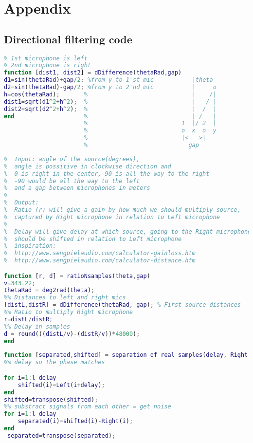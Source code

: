 \chapter{Appendix}
\label{ch:appAlabel}
\section{Directional filtering code}
\begin{lstlisting}[language=Matlab, label=lst:delayDifference]
% Gives distance for the signal to travel to each microphones 
% 1st microphone is left 
% 2nd microphone is right
function [dist1, dist2] = dDifference(thetaRad,gap)
d1=sin(thetaRad)+gap/2; %from y to 1'st mic           |theta
d2=sin(thetaRad)-gap/2; %from y to 2'nd mic           |     o
h=cos(thetaRad);       %                              |    /|
dist1=sqrt(d1^2+h^2);  %                              |   / |
dist2=sqrt(d2^2+h^2);  %                              |  /  |
end                    %                              | /   |
                       %                           1  |/ 2  |
                       %                           o  x  o  y
                       %                           |<--->|
                       %                             gap
\end{lstlisting}

\begin{lstlisting}[language=Matlab, label=lst:ratioNsamples]
%% Function gives ratio and delay, which can be used to realisticaly delay and add realistic gain to the signals
%  Input: angle of the source(degrees), 
%  angle is possitive in clockwise direction and 
%  0 is right in the center, 90 is all the way to the right
%  -90 would be all the way to the left
%  and a gap between microphones in meters
%
%  Output:
%  Ratio (r) will give a gain by how much we should multiply source,
%  captured by Right microphone in relation to Left microphone
%  
%  Delay will give delay at which source, going to the Right microphone
%  should be shifted in relation to Left microphone
%  inspiration: 
%  http://www.sengpielaudio.com/calculator-gainloss.htm
%  http://www.sengpielaudio.com/calculator-distance.htm

function [r, d] = ratioNsamples(theta,gap)
v=343.22;
thetaRad = deg2rad(theta);
%% Distances to left and right mics
[distL,distR] = dDifference(thetaRad, gap); % First source distances
%% Ratio to multiply Right microphone
r=distL/distR;
%% Delay in samples
d = round(((distL/v)-(distR/v))*48000);
end
\end{lstlisting}
\begin{lstlisting}[language=Matlab, label=1st:realSamplesSeparationFunction]
function [separated,shifted] = separation_of_real_samples(delay, Right, Left,l)
%% delay so the phase matches

for i=1:l-delay
    shifted(i)=Left(i+delay);
end
shifted=transpose(shifted);
%% substract signals from each other = get noise
for i=1:l-delay
    separated(i)=shifted(i)-Right(i);
end
 separated=transpose(separated);
\end{lstlisting}

